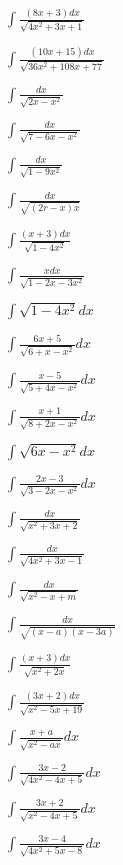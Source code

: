 
\begin{multicols}{2}
$\displaystyle \int \frac{(8x+3)dx}{\sqrt{4x^2+3x+1}}$

$\displaystyle \int \frac{(10x+15)dx}{\sqrt{36x^2+108x+77}}$

$\displaystyle \int \frac{dx}{\sqrt{2x-x^2}}$

$\displaystyle \int \frac{dx}{\sqrt{7-6x-x^2}}$

$\displaystyle \int \frac{dx}{\sqrt{1-9x^2}}$

$\displaystyle \int \frac{dx}{\sqrt{(2r-x)x}}$

$\displaystyle \int \frac{(x+3)dx}{\sqrt{1-4x^2}}$

$\displaystyle \int \frac{xdx}{\sqrt{1-2x-3x^2}}$

$\displaystyle \int \sqrt{1-4x^2}dx$

$\displaystyle \int \frac{6x+5}{\sqrt{6+x-x^2}}dx$

$\displaystyle \int \frac{x-5}{\sqrt{5+4x-x^2}}dx$

$\displaystyle \int \frac{x+1}{\sqrt{8+2x-x^2}}dx$

$\displaystyle \int \sqrt{6x-x^2}dx$

$\displaystyle \int \frac{2x-3}{\sqrt{3-2x-x^2}}dx$

$\displaystyle \int \frac{dx}{\sqrt{x^2+3x+2}}$

$\displaystyle \int \frac{dx}{\sqrt{4x^2+3x-1}}$

$\displaystyle \int \frac{dx}{\sqrt{x^2-x+m}}$

$\displaystyle \int \frac{dx}{\sqrt{(x-a)(x-3a)}}$

$\displaystyle \int \frac{(x+3)dx}{\sqrt{x^2+2x}}$

$\displaystyle \int \frac{(3x+2)dx}{\sqrt{x^2-5x+19}}$

$\displaystyle \int \frac{x+a}{\sqrt{x^2-ax}}dx$

$\displaystyle \int \frac{3x-2}{\sqrt{4x^2-4x+5}}dx$

$\displaystyle \int \frac{3x+2}{\sqrt{x^2-4x+5}}dx$

$\displaystyle \int \frac{3x-4}{\sqrt{4x^2+5x-8}}dx$


\end{multicols}
